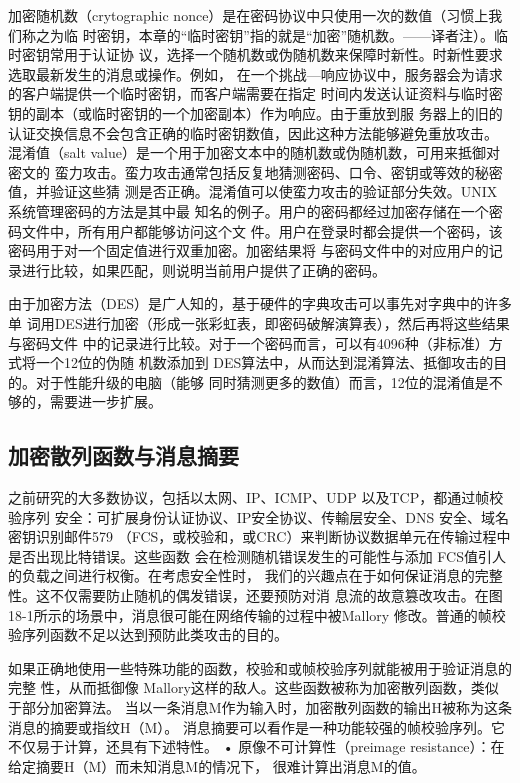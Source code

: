 加密随机数（crytographic nonce）是在密码协议中只使用一次的数值（习惯上我们称之为临
时密钥，本章的“临时密钥”指的就是“加密”随机数。——译者注）。临时密钥常用于认证协
议，选择一个随机数或伪随机数来保障时新性。时新性要求选取最新发生的消息或操作。例如，
在一个挑战—响应协议中，服务器会为请求的客户端提供一个临时密钥，而客户端需要在指定
时间内发送认证资料与临时密钥的副本（或临时密钥的一个加密副本）作为响应。由于重放到服
务器上的旧的认证交换信息不会包含正确的临时密钥数值，因此这种方法能够避免重放攻击。
混淆值（salt value）是一个用于加密文本中的随机数或伪随机数，可用来抵御对密文的
蛮力攻击。蛮力攻击通常包括反复地猜测密码、口令、密钥或等效的秘密值，并验证这些猜
测是否正确。混淆值可以使蛮力攻击的验证部分失效。UNIX 系统管理密码的方法是其中最
知名的例子。用户的密码都经过加密存储在一个密码文件中，所有用户都能够访问这个文
件。用户在登录时都会提供一个密码，该密码用于对一个固定值进行双重加密。加密结果将
与密码文件中的对应用户的记录进行比较，如果匹配，则说明当前用户提供了正确的密码。

由于加密方法（DES）是广人知的，基于硬件的字典攻击可以事先对字典中的许多单
词用DES进行加密（形成一张彩虹表，即密码破解演算表），然后再将这些结果与密码文件
中的记录进行比较。对于一个密码而言，可以有4096种（非标准）方式将一个12位的伪随
机数添加到 DES算法中，从而达到混淆算法、抵御攻击的目的。对于性能升级的电脑（能够
同时猜测更多的数值）而言，12位的混淆值是不够的，需要进一步扩展。

\subsection{加密散列函数与消息摘要}

之前研究的大多数协议，包括以太网、IP、ICMP、UDP 以及TCP，都通过帧校验序列
安全：可扩展身份认证协议、IP安全协议、传輸层安全、DNS 安全、域名密钥识别邮件579
（FCS，或校验和，或CRC）来判断协议数据单元在传输过程中是否出现比特错误。这些函数
会在检测随机错误发生的可能性与添加 FCS值引人的负载之间进行权衡。在考虑安全性时，
我们的兴趣点在于如何保证消息的完整性。这不仅需要防止随机的偶发错误，还要预防对消
息流的故意篡改攻击。在图18-1所示的场景中，消息很可能在网络传输的过程中被Mallory
修改。普通的帧校验序列函数不足以达到预防此类攻击的目的。

如果正确地使用一些特殊功能的函数，校验和或帧校验序列就能被用于验证消息的完整
性，从而抵御像 Mallory这样的敌人。这些函数被称为加密散列函数，类似于部分加密算法。
当以一条消息M作为输入时，加密散列函数的输出H被称为这条消息的摘要或指纹H（M）。
消息摘要可以看作是一种功能较强的帧校验序列。它不仅易于计算，还具有下述特性。
• 原像不可计算性（preimage resistance）：在给定摘要H（M）而未知消息M的情况下，
很难计算出消息M的值。

